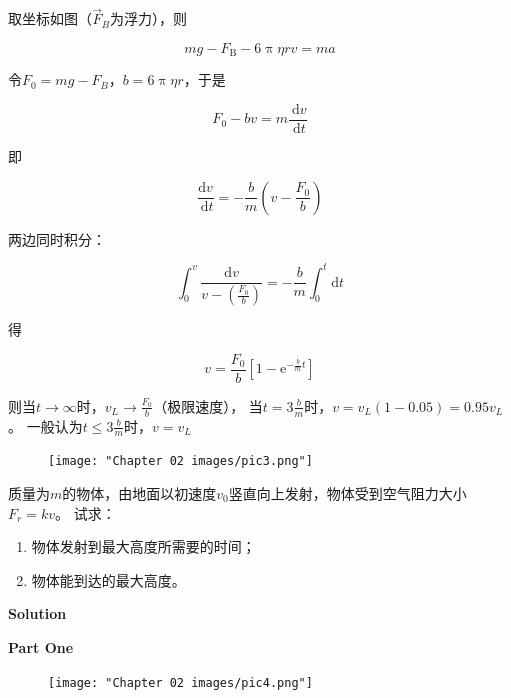 \documentclass[
	12pt, %
	a4paper, %
]{myLegrandOrangeBook}
\newcommand{\rmd}{\mathrm{d}}
\begin{document}
    取坐标如图（\(\overrightarrow{F}_{B}\)为浮力），则

    $$
        m g-F_{\mathrm{B}}-6 \uppi \eta r v=m a
    $$

    令\(F_{0} = mg - F_{B}\)，\(b = 6 \uppi \eta r\)，于是

    $$
        F_0-b v=m \frac{\mathrm{~d} v}{\mathrm{~d} t}
    $$

    即

    $$
        \frac{\mathrm{d} v}{\mathrm{~d} t}=-\frac{b}{m}\left(v-\frac{F_0}{b}\right)
    $$

    两边同时积分：

    $$
        \int_0^v \frac{\rmd v}{v-\left(\frac{F_0}{b}\right)}=-\frac{b}{m} \int_0^t \rmd t
    $$

    得

    $$
        v=\frac{F_0}{b}\left[1-\mathrm{e}^{-\frac{b}{m} t}\right]
    $$

    则当\(t \rightarrow \infty\)时，\(v_{L} \rightarrow \frac{F_{0}}{b}\)（极限速度），
    当\(t = 3 \frac{b}{m}\)时，\(v = v_{L}\left(1-0.05\right) = 0.95 v_{L}\)。
    一般认为\(t \leq 3 \frac{b}{m}\)时，\(v = v_{L}\)

    \begin{figure}[!htbp]
        \centering
        \texttt{[image: "Chapter 02 images/pic3.png"]}
        \label{pic3}
    \end{figure}

    \begin{exercise}

        质量为\(m\)的物体，由地面以初速度\(v_{0}\)竖直向上发射，物体受到空气阻力大小\(F_{r} = kv\)。
        试求：

        \begin{enumerate}
            \item 物体发射到最大高度所需要的时间；
            \item 物体能到达的最大高度。
        \end{enumerate}

    \end{exercise}

    \textbf{Solution}
    \vspace{1em}

    \textbf{Part One}
    \vspace{1em}

    \begin{figure}
        \centering
        \texttt{[image: "Chapter 02 images/pic4.png"]}
        \label{pic4}
    \end{figure}
\end{document}
